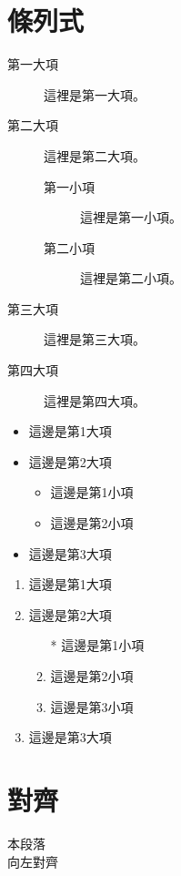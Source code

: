 \clearpage

\section{條列式} \label{sec_item}

\begin{description}
\item[第一大項] 這裡是第一大項。
\item[第二大項] 這裡是第二大項。
   \begin{description}
   \item[第一小項] 這裡是第一小項。
   \item[第二小項] 這裡是第二小項。
   \end{description}
\item[第三大項] 這裡是第三大項。
\item[第四大項] 這裡是第四大項。
\end{description}
   

\begin{itemize}
    \item 這邊是第1大項
    \item 這邊是第2大項
        \begin{itemize}
            \item 這邊是第1小項
            \item 這邊是第2小項
        \end{itemize}
    \item 這邊是第3大項
\end{itemize}

\begin{enumerate}
    \item 這邊是第1大項
    \item 這邊是第2大項
        \begin{enumerate}
            \item[*] 這邊是第1小項
            \item 這邊是第2小項
            \item 這邊是第3小項
        \end{enumerate}
    \item 這邊是第3大項
\end{enumerate}

\newpage

\section{對齊}
\begin{flushleft}
    本段落\\
    向左對齊
\end{flushleft}

